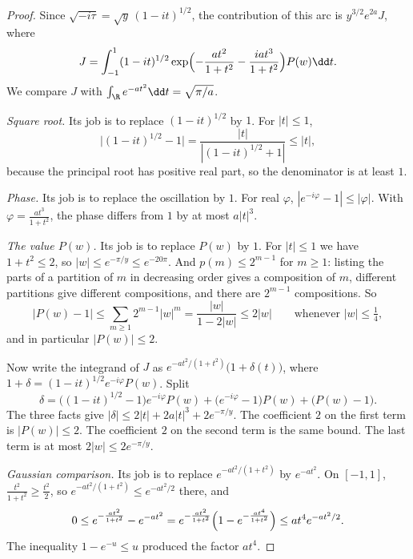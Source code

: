 \begin{proof}
Since $\sqrt{-i\tau}=\sqrt y\,(1-it)^{1/2}$, the contribution of this arc is $y^{3/2}e^{2a}J$, where
\[
J=\int_{-1}^1(1-it)^{1/2}\exp\Bigl(-\frac{at^2}{1+t^2}-\frac{iat^3}{1+t^2}\Bigr)P(w)\dd t.
\]
We compare $J$ with $\int_{\R}e^{-at^2}\dd t=\sqrt{\pi/a}$.

\emph{Square root.} Its job is to replace $(1-it)^{1/2}$ by $1$. For $|t|\le1$,
\[
\bigl|(1-it)^{1/2}-1\bigr|=\frac{|t|}{|(1-it)^{1/2}+1|}\le|t|,
\]
because the principal root has positive real part, so the denominator is at least $1$.

\emph{Phase.} Its job is to replace the oscillation by $1$. For real $\varphi$, $|e^{-i\varphi}-1|\le|\varphi|$. With $\varphi=\frac{at^3}{1+t^2}$, the phase differs from $1$ by at most $a|t|^3$.

\emph{The value $P(w)$.} Its job is to replace $P(w)$ by $1$. For $|t|\le1$ we have $1+t^2\le2$, so $|w|\le e^{-\pi/y}\le e^{-20\pi}$. And $p(m)\le2^{m-1}$ for $m\ge1$: listing the parts of a partition of $m$ in decreasing order gives a composition of $m$, different partitions give different compositions, and there are $2^{m-1}$ compositions. So
\[
|P(w)-1|\le\sum_{m\ge1}2^{m-1}|w|^m=\frac{|w|}{1-2|w|}\le2|w|\qquad\text{whenever }|w|\le\tfrac14,
\]
and in particular $|P(w)|\le2$.

Now write the integrand of $J$ as $e^{-at^2/(1+t^2)}\bigl(1+\delta(t)\bigr)$, where $1+\delta=(1-it)^{1/2}e^{-i\varphi}P(w)$. Split
\[
\delta=\bigl((1-it)^{1/2}-1\bigr)e^{-i\varphi}P(w)+\bigl(e^{-i\varphi}-1\bigr)P(w)+\bigl(P(w)-1\bigr).
\]
The three facts give $|\delta|\le2|t|+2a|t|^3+2e^{-\pi/y}$. The coefficient $2$ on the first term is $|P(w)|\le2$. The coefficient $2$ on the second term is the same bound. The last term is at most $2|w|\le2e^{-\pi/y}$.

\emph{Gaussian comparison.} Its job is to replace $e^{-at^2/(1+t^2)}$ by $e^{-at^2}$. On $[-1,1]$, $\frac{t^2}{1+t^2}\ge\frac{t^2}2$, so $e^{-at^2/(1+t^2)}\le e^{-at^2/2}$ there, and
\[
0\le e^{-\frac{at^2}{1+t^2}}-e^{-at^2}=e^{-\frac{at^2}{1+t^2}}\Bigl(1-e^{-\frac{at^4}{1+t^2}}\Bigr)\le at^4e^{-at^2/2}.
\]
The inequality $1-e^{-u}\le u$ produced the factor $at^4$.


\end{proof}
